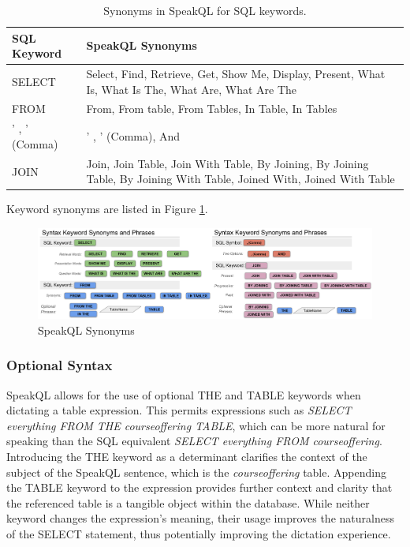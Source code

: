 \begin{center}
\begin{table}
  \begin{tabular}{|m{6em} m{18em}|}
    \hline
    \textbf{SQL Keyword} & \textbf{SpeakQL Synonyms} \\
    \hline
    SELECT & Select, Find, Retrieve, Get, Show Me, Display, Present, What Is, What Is The, What Are, What Are The \\
    \hline
    FROM & From, From table, From Tables, In Table, In Tables \\
    \hline
    ' , ' (Comma) & ' , ' (Comma), And \\
    \hline
    JOIN & Join, Join Table, Join With Table, By Joining, By Joining Table, By Joining With Table, Joined With, Joined With Table \\
    \hline
  \end{tabular}
  \caption{Synonyms in SpeakQL for SQL keywords.}
  \label{tab:keyword-synonyms}
\end{table}
\end{center}

Keyword synonyms are listed in Figure \ref{fig:synonymsslide}.

\begin{figure}
\centering
\includegraphics[width=\textwidth]{figures/all_synonyms.png}
\caption{SpeakQL Synonyms}
\label{fig:synonymsslide}
\end{figure}

\subsubsection{\textbf{Optional Syntax}} 
SpeakQL allows for the use of optional THE and TABLE keywords when dictating a table expression. 
This permits expressions such as \emph{SELECT everything FROM THE courseoffering TABLE}, which can be more natural for speaking than the SQL equivalent \emph{SELECT everything FROM courseoffering}. 
Introducing the THE keyword as a determinant clarifies the context of the subject of the SpeakQL sentence, which is the \emph{courseoffering} table. 
Appending the TABLE keyword to the expression provides further context and clarity that the referenced table is a tangible object within the database. While neither keyword changes the expression's meaning, their usage improves the naturalness of the SELECT statement, thus potentially improving the dictation experience.


